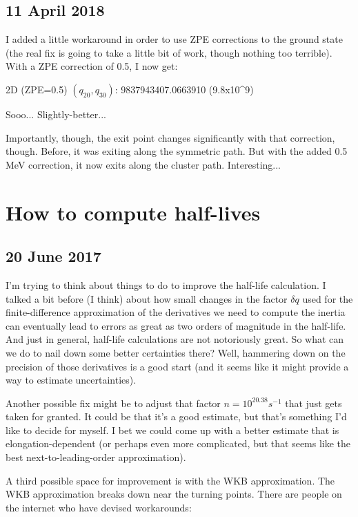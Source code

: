 \documentclass[]{report}
\begin{document}
\subsection*{11 April 2018}
I added a little workaround in order to use ZPE corrections to the ground state (the real fix is going to take a little bit of work, though nothing too terrible). With a ZPE correction of 0.5, I now get:

\begin{list}{}{Half-life in 2 dimensions from Gogny, take 2:}
\item 2D (ZPE=0.5) $(q_{20},q_{30})$:        9837943407.0663910 (9.8x10^9)
\end{list}

Sooo... Slightly-better...

Importantly, though, the exit point changes significantly with that correction, though. Before, it was exiting along the symmetric path. But with the added 0.5 MeV correction, it now exits along the cluster path. Interesting...

\section*{How to compute half-lives}
\subsection*{20 June 2017}
I'm trying to think about things to do to improve the half-life calculation. I talked a bit before (I think) about how small changes in the factor $\delta q$ used for the finite-difference approximation of the derivatives we need to compute the inertia can eventually lead to errors as great as two orders of magnitude in the half-life. And just in general, half-life calculations are not notoriously great. So what can we do to nail down some better certainties there? Well, hammering down on the precision of those derivatives is a good start (and it seems like it might provide a way to estimate uncertainties).

Another possible fix might be to adjust that factor $n=10^{20.38} s^{-1}$ that just gets taken for granted. It could be that it's a good estimate, but that's something I'd like to decide for myself. I bet we could come up with a better estimate that is elongation-dependent (or perhaps even more complicated, but that seems like the best next-to-leading-order approximation).

A third possible space for improvement is with the WKB approximation. The WKB approximation breaks down near the turning points. There are people on the internet who have devised workarounds:
\end{document}
